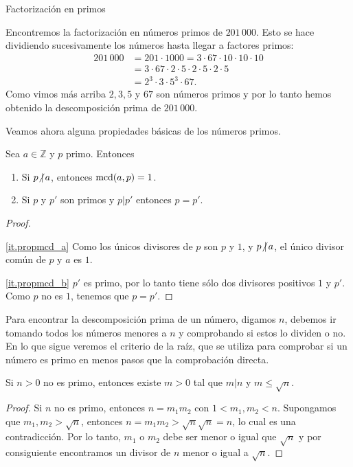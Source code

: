 \begin{section}{Factorización en primos}
\begin{ejemplo*} 
Encontremos la factorización en números primos de $201\,000$. Esto se hace di\-vi\-dien\-do  sucesivamente los números hasta llegar a factores primos:
\begin{align*}
201\,000 &= 201\cdot 1000 = 3\cdot 67\cdot 10\cdot 10\cdot 10\\ &=  3\cdot 67\cdot 2\cdot 5 \cdot 2\cdot 5 \cdot 2\cdot 5 \\&= 2^3\cdot 3\cdot 5^3\cdot 67.
\end{align*}
Como vimos más arriba $2, 3, 5$ y $67$ son  números primos y por lo tanto hemos obtenido la descomposición prima de $201\,000$.
\end{ejemplo*}


Veamos ahora alguna propiedades básicas de los números primos.

\begin{observacion} \label{pdivpp}
Sea $a \in \mathbb Z$ y $p$ primo. Entonces 
\begin{enumerate}[label=\textit{\alph*)}]
\item\label{it.propmcd_a}  Si $p{\operatorname{\not|\,} }a$, entonces $\operatorname{mcd}(a,p) = 1$.
\item\label{it.propmcd_b}  Si $p$ y $p'$ son primos y $p|p'$ entonces $p=p'$.
\end{enumerate}
\end{observacion}
\begin{proof}
\

\noindent \ref{it.propmcd_a} Como los únicos divisores de $p$ son $p$ y $1$, y $p{\operatorname{\not|\,} }a$, el único  divisor común de $p$ y $a$ es $1$.

\noindent \ref{it.propmcd_b} $p'$ es primo, por lo tanto tiene sólo dos divisores positivos $1$ y $p'$. Como $p$ no es $1$, tenemos que  $p=p'$.
\end{proof}

Para encontrar la descomposición prima de un número, digamos $n$, debemos ir tomando todos los números menores a $n$ y comprobando si estos lo dividen o no. En lo que sigue veremos el criterio de la raíz, que se utiliza para comprobar si un número es primo en menos pasos que la comprobación directa.  

\begin{lema} Si $n>0$ no es primo, entonces existe $m>0$ tal que $m|n$ y $m \le \sqrt{n}$.  
\end{lema}
\begin{proof}
Si $n$ no es primo, entonces $n = m_1m_2$ con $1 < m_1,m_2 < n$. Supongamos que $m_1,m_2 > \sqrt n$, entonces $n = m_1m_2 >  \sqrt n\sqrt n = n$, lo cual es una contradicción. Por lo tanto, $m_1$ o $m_2$ debe ser menor o igual que $\sqrt n$ y por consiguiente encontramos un divisor de $n$ menor o igual a  $\sqrt n$. 
\end{proof}


\end{section}
